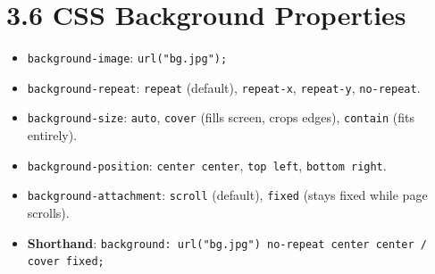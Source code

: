 \section{3.6 CSS Background Properties}
\begin{itemize}[leftmargin=*]
    \item \texttt{background-image}: \texttt{url("bg.jpg");}
    \item \texttt{background-repeat}: \texttt{repeat} (default), \texttt{repeat-x}, \texttt{repeat-y}, \texttt{no-repeat}.
    \item \texttt{background-size}: \texttt{auto}, \texttt{cover} (fills screen, crops edges), \texttt{contain} (fits entirely).
    \item \texttt{background-position}: \texttt{center center}, \texttt{top left}, \texttt{bottom right}.
    \item \texttt{background-attachment}: \texttt{scroll} (default), \texttt{fixed} (stays fixed while page scrolls).
    \item \textbf{Shorthand}: \texttt{background: url("bg.jpg") no-repeat center center / cover fixed;}
\end{itemize}
